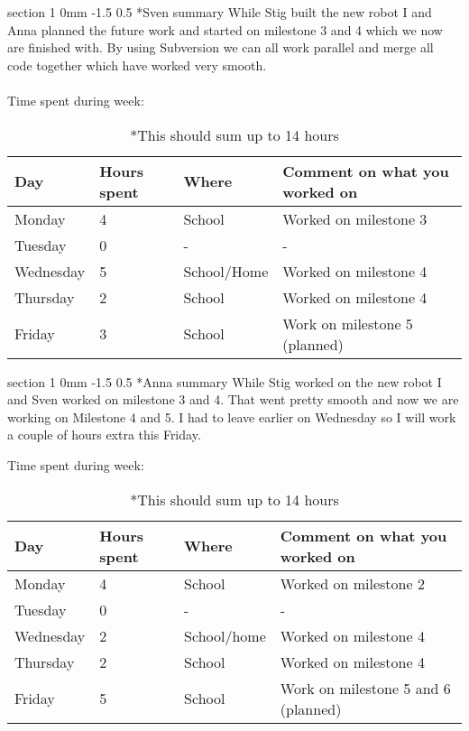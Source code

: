 \documentclass[a4paper,11pt]{article}
\makeatletter
\renewcommand{\section}{\@startsection
   {section}%
   {1}%
   {0mm}%
   {-1.5\baselineskip}%
   {0.5\baselineskip}%
   {\sffamily\bfseries\upshape\normalsize}}%
\makeatother
\begin{document}
\section*{Sven summary}
While Stig built the new robot I and Anna planned the future work and started on milestone 3 and 4 which we now are finished with. By using Subversion we can all work parallel and merge all code together which have worked very smooth.
\\
\\
Time spent during week:
\begin{center}
\begin{table}[H]
    \begin{tabular}{| l | l | l | l |}
    \hline
    Day & Hours spent & Where & Comment on what you worked on \\ \hline
    Monday & 4 & School & Worked on milestone 3 \\ \hline
    Tuesday & 0 & - & - \\ \hline
    Wednesday & 5 & School/Home & Worked on milestone 4 \\ \hline
    Thursday & 2 & School & Worked on milestone 4 \\ \hline
   	Friday & 3 & School & Work on milestone 5 (planned) \\ \hline

    \end{tabular}
    \caption*{*This should sum up to 14 hours}
    \end{table}
\end{center}


\section*{Anna summary}
While Stig worked on the new robot I and Sven worked on milestone 3 and 4. That went pretty smooth and now we are working on Milestone 4 and 5. I had to leave earlier on Wednesday so I will work a couple of hours extra this Friday.

Time spent during week:
\begin{center}
\begin{table}[H]
    \begin{tabular}{| l | l | l | l |}
    \hline
    Day & Hours spent & Where & Comment on what you worked on \\ \hline
    Monday & 4 & School & Worked on milestone 2 \\ \hline
    Tuesday & 0 & - & - \\ \hline
    Wednesday & 2 & School/home & Worked on milestone 4 \\ \hline
    Thursday & 2 & School & Worked on milestone 4 \\ \hline
   	Friday & 5 & School & Work on milestone 5 and 6 (planned) \\ \hline

    \end{tabular}
    \caption*{*This should sum up to 14 hours}
    \end{table}
\end{center}
\end{document}

